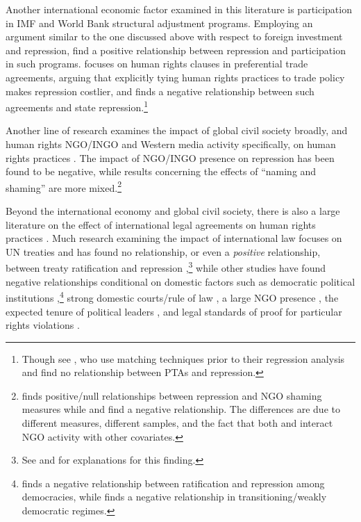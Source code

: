 \documentclass[11pt]{article}
\begin{document}
Another international economic factor examined in this literature is participation in IMF and World Bank structural adjustment programs. Employing an argument similar to the one discussed above with respect to foreign investment and repression, \citet{AbouharbCingranelli2006, AbouharbCingranelli2007} find a positive relationship between repression and participation in such programs. \citet{HafnerBurton2005io} focuses on human rights clauses in preferential trade agreements, arguing that explicitly tying human rights practices to trade policy makes repression costlier, and finds a negative relationship between such agreements and state repression.\footnote{Though see \citet{SpilkerBohmelt2012}, who use matching techniques prior to their regression analysis and find no relationship between PTAs and repression.} 

Another line of research examines the impact of global civil society broadly, and human rights NGO/INGO and Western media activity specifically, on human rights practices \citep{HafnerBurtonTsutsui2005,Franklin2008,HafnerBurton2008,MurdieDavis2012}. The impact of NGO/INGO presence on repression has been found to be negative, while results concerning the effects of ``naming and shaming'' are more mixed.\footnote{\citet{HafnerBurton2008} finds positive/null relationships between repression and NGO shaming measures while \citet{Franklin2008} and \citet{MurdieDavis2012} find a negative relationship. The differences are due to different measures, different samples, and the fact that both \citet{Franklin2008} and \citet{MurdieDavis2012} interact NGO activity with other covariates.} 

Beyond the international economy and global civil society, there is also a large literature on the effect of international legal agreements on human rights practices \citep{Keith1999,Hathaway2002,Neumayer2005,Simmons2009,PowellStaton2009,Hill2010,ConradRitter2013,Lupu2013}. Much research examining the impact of international law focuses on UN treaties and has found no relationship, or even a {\em positive} relationship, between treaty ratification and repression \citep{Keith1999,Hathaway2002,Hill2010},\footnote{See \citet{Vreeland2008} and \citet{HollyerRosendorff2011} for explanations for this finding.} while other studies have found negative relationships conditional on domestic factors such as democratic political institutions \citep{Neumayer2005,Simmons2009},\footnote{\citet{Neumayer2005} finds a negative relationship between ratification and repression among democracies, while \citet{Simmons2009} finds a negative relationship in transitioning/weakly democratic regimes.} strong domestic courts/rule of law \citep{Simmons2009}, a large NGO presence \citep{Neumayer2005}, the expected tenure of political leaders \citep{ConradRitter2013}, and legal standards of proof for particular rights violations \citep{Lupu2013}. 
\end{document}

